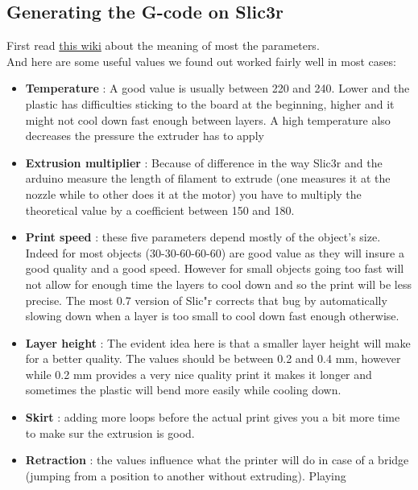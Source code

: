 \documentclass{article}
\begin{document}
\subsection{Generating the G-code on Slic3r}

First read \href{http://richrap.blogspot.com/2012/01/slic3r-is-nicer-part-1-settings-and.html}{this wiki} about the meaning of most the parameters. \\

And here are some useful values we found out worked fairly well in most cases:
\begin{itemize}
\item \textbf{Temperature} : A good value is usually between 220 and 240. Lower and the plastic has difficulties sticking to the board at the beginning, higher and it might not cool down fast enough between layers. A high temperature also decreases the pressure the extruder has to apply
\item \textbf{Extrusion multiplier} : Because of difference in the way Slic3r and the arduino measure the length of filament to extrude (one measures it at the nozzle while to other does it at the motor) you have to multiply the theoretical value by a coefficient between 150 and 180.
\item \textbf{Print speed} : these five parameters depend mostly of the object's size. Indeed for most objects (30-30-60-60-60) are good value as they will insure a good quality and a good speed. However for small objects going too fast will not allow for enough time the layers to cool down and so the print will be less precise. The most 0.7 version of Slic"r corrects that bug by automatically slowing down when a layer is too small to cool down fast enough otherwise.
\item \textbf{Layer height} : The evident idea here is that a smaller layer height will make for a better quality. The values should be between 0.2 and 0.4 mm, however while 0.2 mm provides a very nice quality print it makes it longer and sometimes the plastic will bend more easily while cooling down.
\item \textbf{Skirt} : adding more loops before the actual print gives you a bit more time to make sur the extrusion is good.
\item \textbf{Retraction} : the values influence what the printer will do in case of a bridge (jumping from a position to another without extruding). Playing
\end{itemize}
\end{document}
